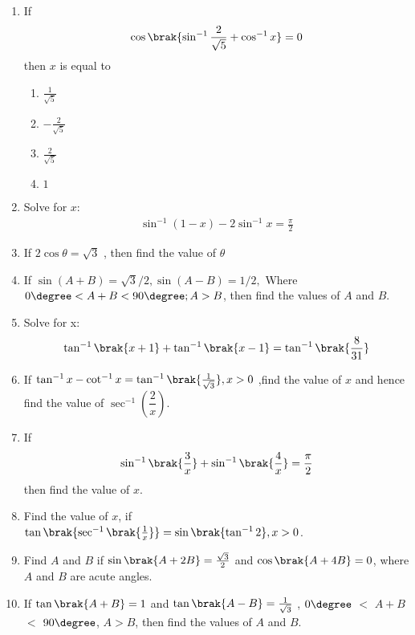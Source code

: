 
\begin{enumerate}[label=\thesubsection.\arabic*.,ref=\thesubsection.\theenumi]
\item
If
\begin{align}
\cos\brak{\sin^{-1}{\frac{2}{\sqrt{5}}} + \cos^{-1}{x}} = 0
\end{align}
then $x$ is equal to
		\begin{multicols}{4}
\begin{enumerate}
	\item $\frac{1}{\sqrt{5}}$
	\item $-\frac{2}{\sqrt{5}}$
	\item $\frac{2}{\sqrt{5}}$
        \item $1$
\end{enumerate}
		\end{multicols}
\hfill{}
\item Solve for $x$:
    \begin{align}
        \sin^{-1}(1-x) - 2 \sin^{-1} x = \frac{\pi}{2}
    \end{align}
\hfill{}
\item If $2\cos  \theta = \sqrt{3}$ , then find the value of $\theta$
\hfill{}
\item If  $\sin (A+B) = \sqrt{3}/2,
 \sin (A-B) = 1/2,$ Where $0\degree<A+B<90\degree; A>B$, then find the values of $A$ and $B$.

\hfill{}
\item Solve for x:
\begin{align*}
\tan^{-1}\brak{x+1}+\tan^{-1}\brak{x-1}=\tan^{-1}\brak{\frac{8}{31}}
\end{align*}
\hfill{}

\item If $\tan^{-1}x-\cot^{-1}x =\tan^{-1}\brak{\frac{1}{ \sqrt3}}, x>0$ ,find the value of $x$ and hence find the value of $\sec^{-1}\left(\dfrac{2}{x}\right)$.

\hfill{}\item  If
\begin{align*}
 \sin^{-1} \brak{\dfrac{3}{x}} + \sin^{-1}\brak{\dfrac{4}{x}}=\dfrac{\pi}{2} 
\end{align*}
then find the value of $x$. 

\hfill{}\item Find the value of $x$, if $\tan \brak{\sec^{-1}\brak{\frac{1}{x}}} = \sin \brak{\tan^{-1}{2}},x > 0$.
\hfill{}

\item Find $A$ and $B$ if $\sin \brak{A + 2B}=\frac{\sqrt{3}}{2}$ and $\cos \brak{A + 4B} = 0$, where $A$ and $B$ are acute angles.
\hfill{}
\item If $\tan \brak{A + B} = 1$ and $\tan \brak{A - B} = \frac{1}{\sqrt{3}}$ , $0\degree$ $<$ $A + B$ $<$ $90\degree$, $A > B$, then find the values of $A$ and $B$.


\end{enumerate}
